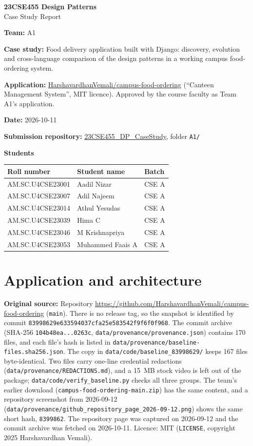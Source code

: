 \documentclass[11pt,a4paper]{article}
\newcommand{\entry}[1]{\par\textbf{#1:} }
\newcommand{\code}[1]{\nolinkurl{#1}}
\begin{document}
\begin{center}\Large\textbf{23CSE455 Design Patterns}\\[4pt]\LARGE Case Study Report\end{center}

\entry{Team}A1
\entry{Case study}Food delivery application built with Django: discovery, evolution and cross-language comparison of the design patterns in a working campus food-ordering system.
\entry{Application}\href{https://github.com/HarshavardhanVemali/campus-food-ordering}{HarshavardhanVemali/campus-food-ordering} (``Canteen Management System'', MIT licence). Approved by the course faculty as Team A1's application.
\entry{Date}2026-10-11
\par\textbf{Submission repository:} \href{https://github.com/aswathymohan-amrita/23CSE455_DP_CaseStudy}{23CSE455\_DP\_CaseStudy}, folder \code{A1/}\par
\textbf{Students}\par
\begin{tabularx}{\linewidth}{@{}llX@{}}\toprule
Roll number & Student name & Batch\\\midrule
AM.SC.U4CSE23001 & Aadil Nizar & CSE A\\
AM.SC.U4CSE23007 & Adil Najeem & CSE A\\
AM.SC.U4CSE23014 & Athul Yesudas & CSE A\\
AM.SC.U4CSE23039 & Hima C & CSE A\\
AM.SC.U4CSE23046 & M Krishnapriya & CSE A\\
AM.SC.U4CSE23053 & Muhammed Faais A & CSE A\\\bottomrule
\end{tabularx}

\section{Application and architecture}
\entry{Original source}Repository \url{https://github.com/HarshavardhanVemali/campus-food-ordering} (\code{main}). There is no release tag, so the snapshot is identified by commit \code{83998629e633}\allowbreak\code{594037cfa25e}\allowbreak\code{583542f9f6f0f968}. The commit archive (SHA-256 \code{104b48ea...0263c}, \code{data/provenance/provenance.json}) contains 170 files, and each file's hash is listed in \code{data/provenance/baseline-files.sha256.json}. The copy in \code{data/code/baseline_83998629/} keeps 167 files byte-identical. Two files carry one-line credential redactions (\code{data/provenance/REDACTIONS.md}), and a 15~MB stock video is left out of the package; \code{data/code/verify_baseline.py} checks all three groups. The team's earlier download (\code{campus-food-ordering-main.zip}) has the same content, and a repository screenshot from 2026-09-12 (\code{data/provenance/github_repository_page_2026-09-12.png}) shows the same short hash, \code{8399862}. The repository page was captured on 2026-09-12 and the commit archive was fetched on 2026-10-11. Licence: MIT (\code{LICENSE}, copyright 2025 Harshavardhan Vemali).
\end{document}
